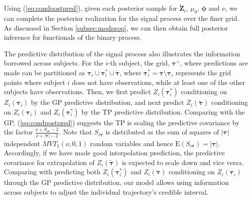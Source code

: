 Using (\ref{eq:condpostpred}), given each posterior sample for $\tilde{\mathbf{Z}}_i$, 
$\mu_0$, $\boldsymbol{\phi}$ and $\nu$, we can complete the posterior realization for the 
signal process over the finer grid. As discussed in Section \ref{subsec:modprop}, we can 
then obtain full posterior inference for functionals of the binary process.


The predictive distribution of the signal process also illustrates the information 
borrowed across subjects. For the $i$-th subject, the grid, $\boldsymbol{\tau}^+$,
where predictions are made can be 
partitioned as $\boldsymbol{\tau}_i\cup\boldsymbol{\tau}_i^*\cup\check{\boldsymbol{\tau}}$, 
where $\boldsymbol{\tau}_i^*=\boldsymbol{\tau}\setminus\boldsymbol{\tau}_i$ represents 
the grid points where subject $i$ does not have observations, while at least one of 
the other subjects have observations. Then, we first predict $Z_i(\boldsymbol{\tau}_i^*)$ 
conditioning on $Z_i(\boldsymbol{\tau}_i)$ by the GP predictive distribution, and next 
predict $Z_i(\check{\boldsymbol{\tau}})$ conditioning on $Z_i(\boldsymbol{\tau}_i)$ 
and $Z_i(\boldsymbol{\tau}_i^*)$ by the TP predictive distribution. 
Comparing with the GP, (\ref{eq:condpostpred}) suggests the TP is scaling the predictive 
covariance by the factor $\frac{\nu+S_{i\boldsymbol{\tau}}-2}{\nu+|\boldsymbol{\tau}|-2}$. 
Note that $S_{i\boldsymbol{\tau}}$ is distributed as the sum of squares of 
$|\boldsymbol{\tau}|$ independent $MVT_1(\nu,0,1)$ random variables and hence 
$\text{E}(S_{i\boldsymbol{\tau}})=|\boldsymbol{\tau}|$. Accordingly, if we have made 
good interpolation prediction, the predictive covariance for extrapolation of
$Z_i(\check{\boldsymbol{\tau}})$ is expected to scale down and vice versa. 
Comparing with predicting both $Z_i(\boldsymbol{\tau}_i^*)$ and 
$Z_i(\check{\boldsymbol{\tau}})$ conditioning on $Z_i(\boldsymbol{\tau}_i)$ 
through the GP predictive distribution, our model allows using information across 
subjects to adjust the individual %
trajectory's credible interval.  





